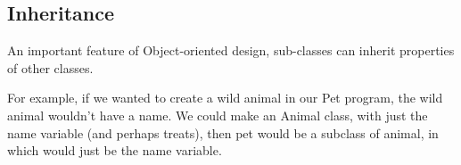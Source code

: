 		\subsection*{Inheritance}
			
			An important feature of Object-oriented design, sub-classes can inherit properties of other classes.
				
			For example, if we wanted to create a wild animal in our Pet program, the wild animal wouldn't have a name. We could make an Animal class, with just the name variable (and perhaps treats), then pet would be a subclass of animal, in which would just be the name variable.
				
			
	\fi
